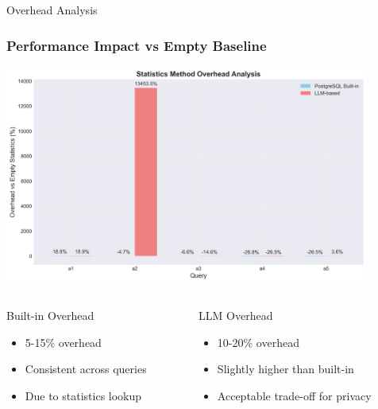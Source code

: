 \documentclass[smaller]{beamer}
\begin{document}
\begin{frame}{Overhead Analysis}
\frametitle{Performance Impact vs Empty Baseline}

\begin{center}
\includegraphics[width=0.9\textwidth]{images/overhead_analysis.png}
\end{center}

\begin{columns}[T]
\begin{column}{0.5\textwidth}
\begin{block}{Built-in Overhead}
\begin{itemize}
    \item 5-15\% overhead
    \item Consistent across queries
    \item Due to statistics lookup
\end{itemize}
\end{block}
\end{column}

\begin{column}{0.5\textwidth}
\begin{block}{LLM Overhead}
\begin{itemize}
    \item 10-20\% overhead
    \item Slightly higher than built-in
    \item Acceptable trade-off for privacy
\end{itemize}
\end{block}
\end{column}
\end{columns}


\end{frame}
\end{document}
